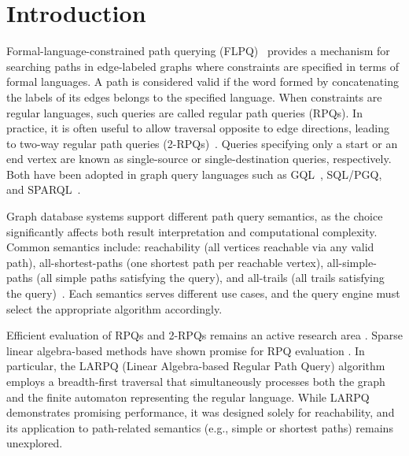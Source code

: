 \section{Introduction}

Formal-language-constrained path querying (FLPQ)~\cite{doi:10.1137/S0097539798337716} provides a mechanism for searching paths in edge-labeled graphs where constraints are specified in terms of formal languages.
A path is considered valid if the word formed by concatenating the labels of its edges belongs to the specified language.
When constraints are regular languages, such queries are called regular path queries (RPQs).
In practice, it is often useful to allow traversal opposite to edge directions, leading to two-way regular path queries (2-RPQs)~\cite{SIGMOD-Record-2003,DBLP:conf/amw/BienvenuCOS14}.
Queries specifying only a start or an end vertex are known as single-source or single-destination queries, respectively.
Both have been adopted in graph query languages such as GQL~\cite{2024gql}, SQL/PGQ, and SPARQL~\cite{2013sparql}.

Graph database systems support different path query semantics, as the choice significantly affects both result interpretation and computational complexity.
Common semantics include: reachability (all vertices reachable via any valid path), all-shortest-paths (one shortest path per reachable vertex), all-simple-paths (all simple paths satisfying the query), and all-trails (all trails satisfying the query)~\cite{DBLP:conf/amw/FariasRV23}.
Each semantics serves different use cases, and the query engine must select the appropriate algorithm accordingly.

Efficient evaluation of RPQs and 2-RPQs remains an active research area \cite{casel_et_al:LIPIcs.ICDT.2021.19,DBLP:journals/corr/abs-2204-11137}.
Sparse linear algebra-based methods have shown promise for RPQ evaluation \cite{10.1007/978-3-031-43980-3_4}.
In particular, the LARPQ (Linear Algebra-based Regular Path Query) algorithm \cite{belyanin2150single} employs a breadth-first traversal that simultaneously processes both the graph and the finite automaton representing the regular language.
While LARPQ demonstrates promising performance, it was designed solely for reachability, and its application to path-related semantics (e.g., simple or shortest paths) remains unexplored.


